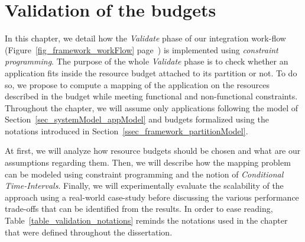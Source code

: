 \documentclass[main.tex]{subfiles}
\begin{document}
\chapter{Validation of the budgets}
\thispagestyle{chapstyle}
\label{chap_budgetValidation}
\minitoc

In this chapter, we detail how the \emph{Validate} phase of our integration
work-flow (Figure~\ref{fig_framework_workFlow}
page~\pageref{fig_framework_workFlow}) is implemented using \emph{constraint
programming}. The purpose of the whole \emph{Validate} phase is to check
whether an application fits inside the resource budget attached to its
partition or not. To do so, we propose to compute a mapping of the application
on the resources described in the budget while meeting functional and
non-functional constraints. Throughout the chapter, we will assume only
applications following the model of Section~\ref{sec_systemModel_appModel} and
budgets formalized using the notations introduced in
Section~\ref{ssec_framework_partitionModel}.

At first, we will analyze how resource budgets should be chosen and what are
our assumptions regarding them. Then, we will describe how the mapping problem
can be modeled using constraint programming and the notion of \emph{Conditional
Time-Intervals}. Finally, we will experimentally evaluate the scalability of
the approach using a real-world case-study before discussing the various
performance trade-offs that can be identified from the results. In order to
ease reading, Table~\ref{table_validation_notations} reminds the notations used
in the chapter that were defined throughout the dissertation.
\end{document}
